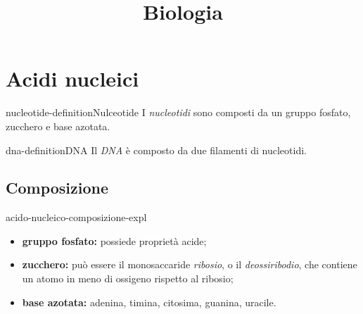 \documentclass[preview]{standalone}
\begin{document}
\title{Biologia}
\genpage

\section{Acidi nucleici}


\begin{snippetdefinition}{nucleotide-definition}{Nulceotide}
    I \textit{nucleotidi} sono composti da un gruppo fosfato, zucchero e base azotata.
\end{snippetdefinition}

\begin{snippetdefinition}{dna-definition}{DNA}
    Il \textit{DNA} è composto da due filamenti di nucleotidi.
\end{snippetdefinition}

\subsection{Composizione}


\begin{snippet}{acido-nucleico-composizione-expl}
    \begin{itemize}
        \item \textbf{gruppo fosfato:} possiede proprietà acide;
        \item \textbf{zucchero:} può essere il monosaccaride \textit{ribosio}, o il \textit{deossiribodio},
            che contiene un atomo in meno di ossigeno rispetto al ribosio;
        \item \textbf{base azotata:} adenina, timina, citosima, guanina, uracile.
    \end{itemize}
\end{snippet}
\end{document}
